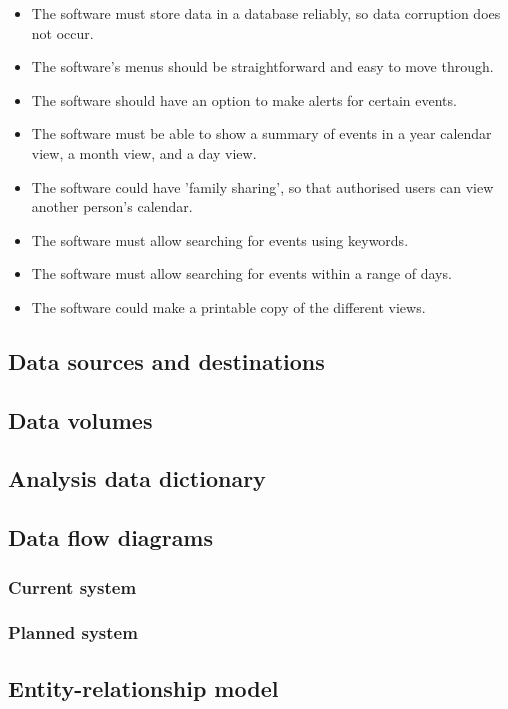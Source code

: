 \begin{itemize}
  \item The software must store data in a database reliably, so
        data corruption does not occur.
  \item The software's menus should be straightforward and easy to move
        through.
  \item The software should have an option to make alerts for certain
        events.
  \item The software must be able to show a summary of events in a
        year calendar view, a month view, and a day view.
  \item The software could have 'family sharing', so that authorised
        users can view another person's calendar.
  \item The software must allow searching for events using keywords.
  \item The software must allow searching for events within a range of
        days.
  \item The software could make a printable copy of the different
        views.
\end{itemize}


\lipsum
\subsection{Data sources and destinations}
\lipsum
\subsection{Data volumes}
\lipsum
\subsection{Analysis data dictionary}
\subsection{Data flow diagrams}
\subsubsection{Current system}
\lipsum
\subsubsection{Planned system}
\lipsum
\subsection{Entity-relationship model}
\lipsum
